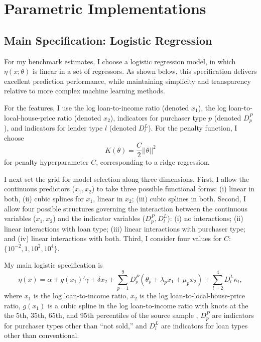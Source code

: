 \documentclass[letterpaper,12pt,usenames,dvipsnames]{article}
\newcommand{\pbrac}[1]{\left( #1 \right)}
\newcommand{\pfrac}[2]{\pbrac{\frac{#1}{#2}}}
\theoremstyle{definition}
\begin{document}
\section{Parametric Implementations}
\label{sec:parametric-implementations}

\subsection{Main Specification: Logistic Regression}
\label{sec:logistic-model}

For my benchmark estimates, I choose a logistic regression model, in which $\eta(x; \theta)$ is linear in a set of regressors. As shown below, this specification delivers excellent prediction performance, while maintaining simplicity and transparency relative to more complex machine learning methods. 

For the features, I use the log loan-to-income ratio (denoted $x_1$), the log loan-to-local-house-price ratio (denoted $x_2$), indicators for purchaser type $p$ (denoted $D^P_{p}$), and indicators for lender type $l$ (denoted $D^L_l$). For the penalty function, I choose
\begin{equation*}
	K(\theta) = \frac{C}{2} ||\theta||^2
\end{equation*}
for penalty hyperparameter $C$, corresponding to a ridge regression.

I next set the grid for model selection along three dimensions. First, I allow the continuous predictors ($x_1, x_2$) to take three possible functional forms: (i) linear in both, (ii) cubic splines for $x_1$, linear in $x_2$; (iii) cubic splines in both. Second, I allow four possible structures governing the interaction between the continuous variables ($x_1, x_2$) and the indicator variables ($D^P_p, D^L_l$): (i) no interactions; (ii) linear interactions with loan type; (iii) linear interactions with purchaser type; and (iv) linear interactions with both. Third, I consider four values for $C$: $\{10^{-2}, 1, 10^2, 10^4\}$.

My main logistic specification is
\begin{equation}
	\eta(x) 
	= \alpha + g(x_1)'\gamma + \delta x_2
	+ \sum_{p=1}^{9} D^{P}_{p} \pbrac{\theta_p + \lambda_p x_1 + \mu_p x_2}
	+ \sum_{l=2}^{4} D^{L}_{l} \kappa_l ,
	\label{eq:logit}
\end{equation}
where
$x_1$ is the log loan-to-income ratio, $x_2$ is the log loan-to-local-house-price ratio, $g(x_1)$ is a cubic spline in the log loan-to-income ratio with knots at the
the 5th, 35th, 65th, and 95th percentiles of the source sample \citep{harrell2015regression},
$D^{P}_{p}$ are indicators for purchaser types other than ``not sold,'' and $D^{L}_{l}$ are
indicators for loan types other than conventional. 
\end{document}
